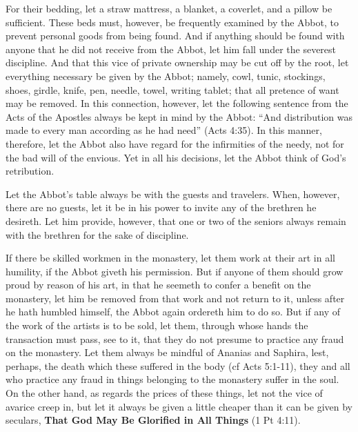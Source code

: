 For their bedding, let a straw mattress, a blanket, a coverlet, and a pillow be sufficient. These beds must, however, be frequently examined by the Abbot, to prevent personal goods from being found. And if anything should be found with anyone that he did not receive from the Abbot, let him fall under the severest discipline. And that this vice of private ownership may be cut off by the root, let everything necessary be given by the Abbot; namely, cowl, tunic, stockings, shoes, girdle, knife, pen, needle, towel, writing tablet; that all pretence of want may be removed. In this connection, however, let the following sentence from the Acts of the Apostles always be kept in mind by the Abbot: ``And distribution was made to every man according as he had need'' (Acts 4:35). In this manner, therefore, let the Abbot also have regard for the infirmities of the needy, not for the bad will of the envious. Yet in all his decisions, let the Abbot think of God's retribution.


Let the Abbot's table always be with the guests and travelers. When, however, there are no guests, let it be in his power to invite any of the brethren he desireth. Let him provide, however, that one or two of the seniors always remain with the brethren for the sake of discipline.


If there be skilled workmen in the monastery, let them work at their art in all humility, if the Abbot giveth his permission. But if anyone of them should grow proud by reason of his art, in that he seemeth to confer a benefit on the monastery, let him be removed from that work and not return to it, unless after he hath humbled himself, the Abbot again ordereth him to do so. But if any of the work of the artists is to be sold, let them, through whose hands the transaction must pass, see to it, that they do not presume to practice any fraud on the monastery. Let them always be mindful of Ananias and Saphira, lest, perhaps, the death which these suffered in the body (cf Acts 5:1-11), they and all who practice any fraud in things belonging to the monastery suffer in the soul. On the other hand, as regards the prices of these things, let not the vice of avarice creep in, but let it always be given a little cheaper than it can be given by seculars, \textbf{That God May Be Glorified in All Things} (1 Pt 4:11).


